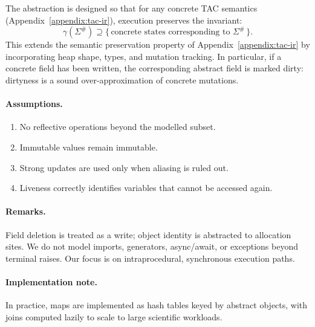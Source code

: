 The abstraction is designed so that for any concrete TAC semantics
(Appendix~\ref{appendix:tac-ir}),
execution preserves the invariant:
\[
\gamma(\Sigma^\#) \supseteq
\{\, \text{concrete states corresponding to }\Sigma^\# \,\}.
\]
This extends the semantic preservation property of
Appendix~\ref{appendix:tac-ir} by incorporating heap shape,
types, and mutation tracking.
In particular, if a concrete field has been written,
the corresponding abstract field is marked dirty:
dirtyness is a sound over-approximation of concrete mutations.

\paragraph{Assumptions.}
\begin{enumerate}
  \item No reflective operations beyond the modelled subset.
  \item Immutable values remain immutable.
  \item Strong updates are used only when aliasing is ruled out.
  \item Liveness correctly identifies variables that cannot be accessed again.
\end{enumerate}

\paragraph{Remarks.}
Field deletion is treated as a write; object identity is abstracted to allocation sites.
We do not model imports, generators, async/await, or exceptions beyond terminal raises.
Our focus is on intraprocedural, synchronous execution paths.

\paragraph{Implementation note.}
In practice, maps are implemented as hash tables keyed by abstract objects,
with joins computed lazily to scale to large scientific workloads.
